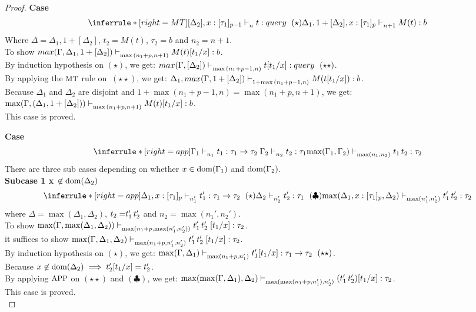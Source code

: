 \documentclass{article}
\begin{document}
\begin{proof}
\noindent \textbf{Case} 
$$
   \inferrule*[ right = MT ]
   {[\Delta_2], x: [\tau_1]_{p-1} \jtype{n}{}{t}{query} ~ (\star)}
   {\Delta_1, 1 + [\Delta_2], x: [\tau_1]_{p} \jtype{n+1}{}{M(t)}{b}  }
$$
Where $\Delta = \Delta_1, 1 + [\Delta_2] $, $t_2 = M(t)$, $\tau_2 = b$ and $n_2 = n + 1$.\\
To show $max(\Gamma, \Delta_1, 1 + [\Delta_2]) \mathrel{\vdash_{\max{(n_1 + p, n + 1)}}^{} {M(t)[t_1/x]} : {b}} $.\\
By induction hypothesis on $ (\star)$, we get:
$max(\Gamma, [\Delta_2]) \jtype{\max{(n_1 + p - 1, n)}}{}{t[t_1/x]}{query}~ (\star \star)$.\\
By applying the $\mbox{\small{MT}}$ rule on $~ (\star \star)$, we get: 
$\Delta_1, max(\Gamma, 1 + [\Delta_2]) \mathrel{\vdash_{1 + \max{(n_1 + p - 1, n)}}^{} {M(t[t_1/x])} : {b}}$.\\
Because $\Delta_1$ and $\Delta_2$ are disjoint and $1 + \max{(n_1 + p - 1, n)} = \max{(n_1 + p, n + 1)}$, we get: \\
$\max(\Gamma,(\Delta_1, 1 + [\Delta_2])) \mathrel{\vdash_{\max{(n_1 + p, n + 1)}}^{} {M(t)[t_1/x]} : {b}}$.\\
This case is proved.


\noindent \textbf{Case} 
$$
  \inferrule*[ right = app ]
   {\Gamma_1 \jtype{n_1}{}{t_1}{\tau_1 \rightarrow \tau_2} \\ \Gamma_2 \jtype{n_2}{}{t_2}{\tau_1}}
   { \max(\Gamma_1, \Gamma_2) \jtype{\max(n_1,n_2)}{}{\app{t_1}{t_2}}{\tau_2}  }
$$
There are three sub cases depending on whether $x \in \text{dom}(\Gamma_1)$ and $\text{dom}(\Gamma_2)$.\\

 \textbf{Subcase 1 x $\not \in \text{dom}(\Delta_2)$ } 
$$
  \inferrule*[ right = app ]
   {\Delta_1, x: [\tau_1]_p \jtype{n_1'}{}{t_1'}{\tau_1 \rightarrow \tau_2} ~(\star) \\ \Delta_2 \jtype{n_2'}{}{t_2'}{\tau_1} ~ (\clubsuit)}
   { \max(\Delta_1, x: [\tau_1]_p, \Delta_2) \jtype{\max(n_1',n_2')}{}{\app{t_1'}{t_2'}}{\tau_2} }
$$
where $\Delta = \max(\Delta_1, \Delta_2)$, $t_2 = \mathrel{ {t_1'} \, {t_2'} }$ and $n_2 = \max(n_1',n_2')$.\\
To show $\max(\Gamma,\max(\Delta_1, \Delta_2))\mathrel{\vdash_{\max(n_1 + p, \max(n_1',n_2'))}^{} {\mathrel{ {t_1'} \, {t_2'} }[t_1/x]} : {\tau_2}} $.\\
it suffices to show $\max(\Gamma,\Delta_1, \Delta_2)\mathrel{\vdash_{\max(n_1 + p, n_1',n_2')}^{} {\mathrel{ {t_1'} \, {t_2'} }[t_1/x]} : {\tau_2}} $.\\
By induction hypothesis on $(\star)$, we get: 
$\max(\Gamma,\Delta_1)\jtype{\max(n_1 + p, n_1')}{}{t_1'[t_1/x]}{\tau_1 \rightarrow \tau_2} ~ (\star \star)$.\\
Because $x \not \in \text{dom}(\Delta_2) \implies t_2'[t_1/x] = t_2'$.\\
By applying $\mbox{\small{APP}}$ on $(\star \star)$ and $(\clubsuit)$, we get:
$\max(\max(\Gamma,\Delta_1), \Delta_2)\mathrel{\vdash_{\max(\max(n_1 + p, n_1'),n_2')}^{} {(\mathrel{ {t_1'} \, {t_2'} })[t_1/x]} : {\tau_2}} $.\\
This case is proved.\\


\end{proof}
\end{document}
